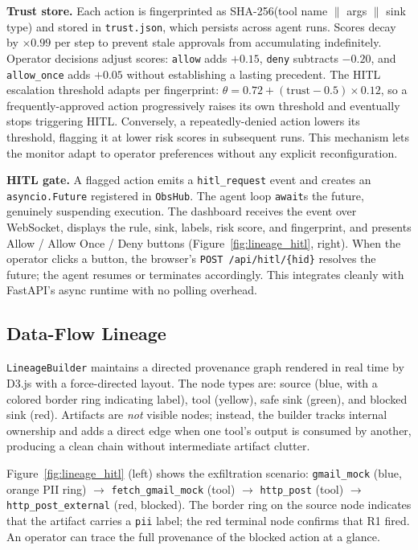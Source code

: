 \documentclass{article} %
\theoremstyle{plain}
\theoremstyle{definition}
\theoremstyle{remark}
\begin{document}
\textbf{Trust store.}
Each action is fingerprinted as SHA-256(tool name $\|$ args $\|$ sink type)
and stored in \texttt{trust.json}, which persists across agent runs.
Scores decay by $\times 0.99$ per step to prevent stale approvals from
accumulating indefinitely. Operator decisions adjust scores: \texttt{allow}
adds $+0.15$, \texttt{deny} subtracts $-0.20$, and \texttt{allow\_once}
adds $+0.05$ without establishing a lasting precedent.
The HITL escalation threshold adapts per fingerprint:
$\theta = 0.72 + (\text{trust} - 0.5) \times 0.12$,
so a frequently-approved action progressively raises its own threshold
and eventually stops triggering HITL. Conversely, a repeatedly-denied action
lowers its threshold, flagging it at lower risk scores in subsequent runs.
This mechanism lets the monitor adapt to operator preferences without any
explicit reconfiguration.

\textbf{HITL gate.}
A flagged action emits a \texttt{hitl\_request} event and creates an
\texttt{asyncio.Future} registered in \texttt{ObsHub}. The agent loop
\texttt{await}s the future, genuinely suspending execution. The dashboard
receives the event over WebSocket, displays the rule, sink, labels, risk
score, and fingerprint, and presents Allow / Allow Once / Deny buttons
(Figure~\ref{fig:lineage_hitl}, right). When the operator clicks a button,
the browser's \texttt{POST /api/hitl/\{hid\}} resolves the future; the
agent resumes or terminates accordingly. This integrates cleanly with
FastAPI's async runtime with no polling overhead.

\vspace{-1em}
\subsection{Data-Flow Lineage}
\vspace{-0.3em}

\texttt{LineageBuilder} maintains a directed provenance graph rendered in
real time by D3.js with a force-directed layout. The node types are:
source (blue, with a colored border ring indicating label), tool (yellow),
safe sink (green), and blocked sink (red). Artifacts are \emph{not} visible
nodes; instead, the builder tracks internal ownership and adds a direct
edge when one tool's output is consumed by another, producing a clean
chain without intermediate artifact clutter.

Figure~\ref{fig:lineage_hitl} (left) shows the exfiltration scenario:
\texttt{gmail\_mock} (blue, orange PII ring) $\to$ \texttt{fetch\_gmail\_mock}
(tool) $\to$ \texttt{http\_post} (tool) $\to$ \texttt{http\_post\_external}
(red, blocked). The border ring on the source node indicates that the
artifact carries a \texttt{pii} label; the red terminal node confirms that
R1 fired. An operator can trace the full provenance of the blocked action
at a glance.
\end{document}
